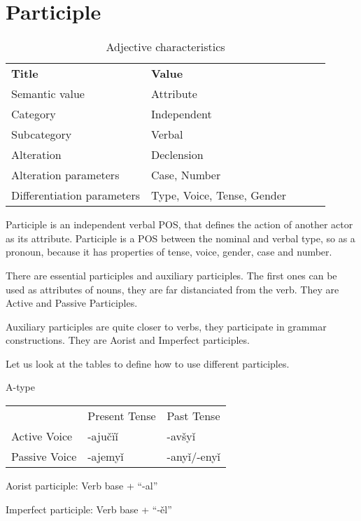 \section{Participle}

\begin{table}[h]
	\caption{Adjective characteristics}
	\begin{tabular}{lllll}
		\textbf{Title}              & \textbf{Value}               \\
		Semantic value              & Attribute                    \\
		Category                    & Independent                  \\
		Subcategory                 & Verbal                       \\
		Alteration                  & Declension                   \\
		Alteration parameters       & Case, Number                 \\
		Differentiation parameters  & Type, Voice, Tense, Gender
	\end{tabular}
\end{table}

Participle is an independent verbal POS, that defines the action of another actor as its attribute. Participle is a POS between the nominal and verbal type, so as a pronoun, because it has properties of tense, voice, gender, case and number.

There are essential participles and auxiliary participles. The first ones can be used as attributes of nouns, they are far distanciated from the verb. They are Active and Passive Participles.

Auxiliary participles are quite closer to verbs, they participate in grammar constructions. They are Aorist and Imperfect participles.

Let us look at the tables to define how to use different participles.

A-type

\begin{table}
	\begin{tabular}{lll}
		& Present Tense & Past Tense \\
		 Active Voice & -ajučïǐ & -avšyǐ \\
		 Passive Voice & -ajemyǐ & -anyǐ/-enyǐ
	\end{tabular}
\end{table}

Aorist participle: Verb base + “-al”

Imperfect participle: Verb base + “-ěl”

